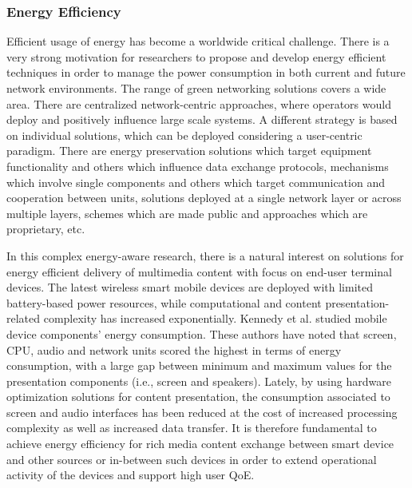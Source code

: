 \subsubsection{Energy Efficiency}
\label{sec:IEEECOMSTenergy}
Efficient usage of energy has become a worldwide critical challenge. There is a very strong motivation for researchers to propose and develop energy efficient techniques in order to manage the power consumption in both current and future network environments. The range of green networking solutions covers a wide area. There are centralized network-centric approaches, where operators would deploy and positively influence large scale systems. A different strategy is based on individual solutions, which can be deployed considering a user-centric paradigm. There are energy preservation solutions which target equipment functionality and others which influence data exchange protocols, mechanisms which involve single components and others which target communication and cooperation between units, solutions deployed at a single network layer or across multiple layers, schemes which are made public and approaches which are proprietary, etc.

In this complex energy-aware research, 
there is a natural interest on solutions for energy efficient delivery of multimedia content with focus on end-user terminal devices. The latest wireless smart mobile devices are deployed with limited battery-based power resources, while computational and content presentation-related complexity has increased exponentially. 
Kennedy et al. \cite{kennedy2013} studied mobile device components' energy consumption. These authors have noted that screen, CPU, audio and network units scored the highest in terms of energy consumption, with a large gap between minimum and maximum values for the presentation components (i.e., screen and speakers). Lately, by using hardware optimization solutions for content presentation, the consumption associated to screen and audio interfaces has been reduced at the cost of increased processing complexity as well as increased data transfer.
It is therefore fundamental to achieve energy efficiency for rich media content exchange between smart device and other sources or in-between such devices in order to extend operational activity of the devices and support high user QoE. 

